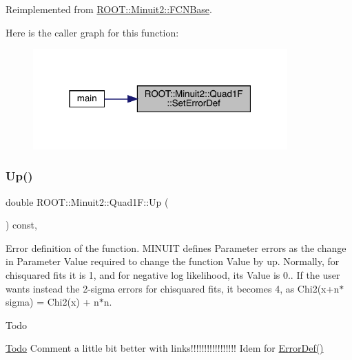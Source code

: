 Reimplemented from \mbox{\hyperlink{classROOT_1_1Minuit2_1_1FCNBase_a840e02c2e6ef96eec289deca096b6088}{R\+O\+O\+T\+::\+Minuit2\+::\+F\+C\+N\+Base}}.

Here is the caller graph for this function\+:
\nopagebreak
\begin{figure}[H]
\begin{center}
\leavevmode
\includegraphics[width=277pt]{d9/de8/classROOT_1_1Minuit2_1_1Quad1F_a086ed11e56374ff0331676d7eac34395_icgraph}
\end{center}
\end{figure}
\mbox{\label{classROOT_1_1Minuit2_1_1Quad1F_a14469d6031751fa382120df6327da5ee}} 
\subsubsection{\texorpdfstring{Up()}{Up()}\hspace{0.1cm}{\footnotesize\ttfamily [1/2]}}
{\footnotesize\ttfamily double R\+O\+O\+T\+::\+Minuit2\+::\+Quad1\+F\+::\+Up (\begin{DoxyParamCaption}{ }\end{DoxyParamCaption}) const\hspace{0.3cm}{\ttfamily [inline]}, {\ttfamily [virtual]}}

Error definition of the function. M\+I\+N\+U\+IT defines Parameter errors as the change in Parameter Value required to change the function Value by up. Normally, for chisquared fits it is 1, and for negative log likelihood, its Value is 0.. If the user wants instead the 2-\/sigma errors for chisquared fits, it becomes 4, as Chi2(x+n$\ast$sigma) = Chi2(x) + n$\ast$n.

\begin{DoxyRefDesc}{Todo}
\item[\mbox{\hyperlink{todo__todo000001}{Todo}}]Comment a little bit better with links!!!!!!!!!!!!!!!!! Idem for \mbox{\hyperlink{classROOT_1_1Minuit2_1_1FCNBase_ac4592475c58a65b037ba97ab5f3cba10}{Error\+Def()}}\end{DoxyRefDesc}


